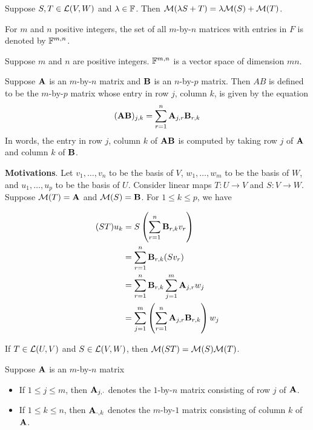 \documentclass{extarticle}
\begin{document}
\begin{corollary}
    Suppose \(S, T \in \mathcal{L}(V, W)\) and \(\lambda \in \mathbb{F}\). Then \(\mathcal{M}(\lambda S + T) =\lambda \mathcal{M}(S) + \mathcal{M}(T)\). 
\end{corollary}

For \(m\) and \(n\) positive integers, the set of all \(m\)-by-\(n\) matrices with entries in \(F\)
is denoted by \(\mathbb{F}^{m,n}\). 

\begin{thm}
    Suppose \(m\) and \(n\) are positive integers. \(\mathbb{F}^{m, n}\) is a vector space of dimension 
    \(mn\). 
\end{thm}

\begin{definition}
    Suppose \(\mathbf{A}\) is an \(m\)-by-\(n\) matrix and \(\mathbf{B}\) is an \(n\)-by-\(p\) matrix. Then \(AB\) is defined 
    to be the \(m\)-by-\(p\) matrix whose entry in row \(j\), column \(k\), is given by the equation
    \[(\mathbf{A} \mathbf{B})_{j,k} = \sum_{r=1}^{n} \mathbf{A}_{j, r} \mathbf{B}_{r, k}\]
    In words, the entry in row \(j\), column \(k\) of \(\mathbf{A} \mathbf{B}\) is computed by taking row \(j\)
    of \(\mathbf{A}\) and column \(k\) of \(\mathbf{B}\).  
\end{definition}

\textbf{Motivations}. Let \(v_1, \ldots, v_n\) to be the basis of \(V\), \(w_1, \ldots, w_m\)
to be the basis of \(W\), and \(u_1, \ldots, u_p\) to be the basis of \(U\). Consider linear 
maps \(T \colon U \to V\) and \(S \colon V \to W\). Suppose \(\mathcal{M}(T) = \mathbf{A}\) and \(\mathcal{M}(S) = \mathbf{B}\). 
For \(1 \leq k \leq p\), we have 

\begin{align*}
    (ST) u_k 
    &= S \left(\sum_{r=1}^{n}\mathbf{B}_{r, k} v_r \right) \\ 
    &= \sum_{r=1}^{n} \mathbf{B}_{r, k} (S v_r) \\ 
    &= \sum_{r=1}^{n} \mathbf{B}_{r,k} \sum_{j=1}^{m} \mathbf{A}_{j, r} w_j \\ 
    &= \sum_{j=1}^{m} \left(\sum_{r=1}^{n} \mathbf{A}_{j, r} \mathbf{B}_{r, k} \right) w_j
\end{align*}

\begin{thm}
    If \(T \in \mathcal{L}(U, V)\) and \(S \in \mathcal{L}(V, W)\), then \(\mathcal{M}(ST) = \mathcal{M}(S)\mathcal{M}(T)\).
\end{thm}

\begin{definition}
    Suppose \(\mathbf{A}\) is an \(m\)-by-\(n\) matrix 
    \begin{itemize}
        \item If \(1 \leq j \leq m\), then \(\mathbf{A}_{j, \cdot}\) denotes the \(1\)-by-\(n\) matrix 
        consisting of row \(j\) of \(\mathbf{A}\). 
        \item If \(1 \leq k \leq n\), then \(\mathbf{A}_{\cdot, k}\) denotes the \(m\)-by-\(1\) matrix consisting 
        of column \(k\) of \(\mathbf{A}\). 
    \end{itemize}
\end{definition}
\end{document}
